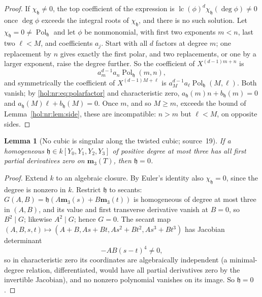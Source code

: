 \documentclass[11pt]{article}
\numberwithin{equation}{section}
\newtheorem{lemma}[theorem]{Lemma}
\theoremstyle{definition}
\theoremstyle{remark}
\newcommand{\lc}{\operatorname{lc}}
\begin{document}
\begin{proof}
If $\chi_{\mathfrak h}\ne0$, the top coefficient of the expression is
$\lc(\phi)^d\chi_{\mathfrak h}(\deg\phi)\ne0$ once $\deg\phi$ exceeds the
integral roots of $\chi_{\mathfrak h}$, and there is no such solution. Let
$\chi_{\mathfrak h}=0\ne\operatorname{Pol}_{\mathfrak h}$ and let $\phi$ be
nonmonomial, with first two exponents $m<n$, last two $\ell<M$, and
coefficients $a_j$. Start with all $d$ factors at degree $m$; one replacement by
$n$ gives exactly the first polar, and two replacements, or one by a larger
exponent, raise the degree further. So the coefficient of $X^{(d-1)m+n}$ is
\begin{equation}\label{hol:nr:eq:bottom}
 a_m^{d-1}a_n\operatorname{Pol}_{\mathfrak h}(m,n),
\end{equation}
and symmetrically the coefficient of $X^{(d-1)M+\ell}$ is
$a_M^{d-1}a_\ell\operatorname{Pol}_{\mathfrak h}(M,\ell)$. Both vanish; by
\eqref{hol:nr:eq:polarfactor} and characteristic zero,
$a_{\mathfrak h}(m)n+b_{\mathfrak h}(m)=0$ and
$a_{\mathfrak h}(M)\ell+b_{\mathfrak h}(M)=0$. Once $m$, and so $M\ge m$,
exceeds the bound of Lemma~\ref{hol:nr:lem:side}, these are incompatible:
$n>m$ but $\ell<M$, on opposite sides.
\end{proof}

\begin{lemma}[No cubic is singular along the twisted cubic; source~19]
\label{hol:nr:lem:secant}
If a homogeneous $\mathfrak h\in k[Y_0,Y_1,Y_2,Y_3]$ of positive degree at
most three has all first partial derivatives zero on $\mathbf m_3(T)$, then
$\mathfrak h=0$.
\end{lemma}

\begin{proof}
Extend $k$ to an algebraic closure. By Euler's identity also
$\chi_{\mathfrak h}=0$, since the degree is nonzero in $k$. Restrict
$\mathfrak h$ to secants: $G(A,B)=\mathfrak h(A\mathbf m_3(s)+B\mathbf m_3(t))$
is homogeneous of degree at most three in $(A,B)$, and its value and first
transverse derivative vanish at $B=0$, so $B^2\mid G$; likewise $A^2\mid G$;
hence $G=0$. The secant map
$(A,B,s,t)\mapsto(A+B,As+Bt,As^2+Bt^2,As^3+Bt^3)$ has Jacobian determinant
\begin{equation}\label{hol:nr:eq:jacobian}
 -AB(s-t)^4\ne0,
\end{equation}
so in characteristic zero its coordinates are algebraically independent (a
minimal-degree relation, differentiated, would have all partial derivatives
zero by the invertible Jacobian), and no nonzero polynomial vanishes on its
image. So $\mathfrak h=0$.
\end{proof}
\end{document}
